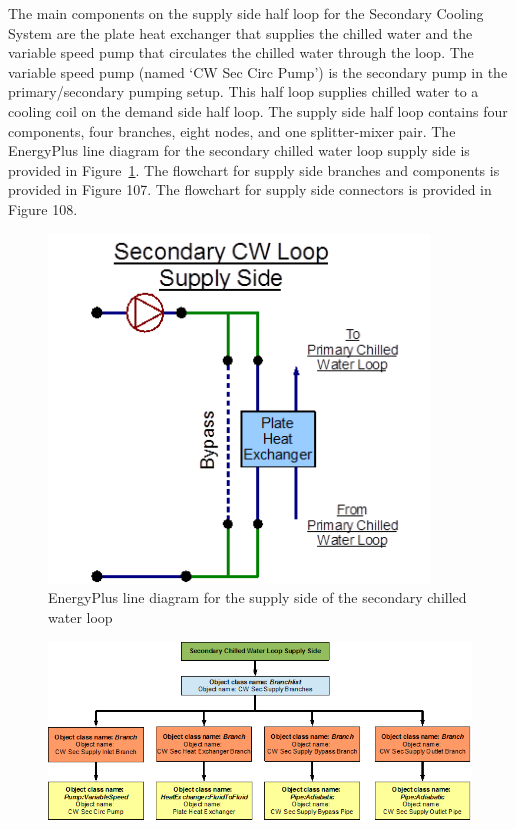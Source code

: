 The main components on the supply side half loop for the Secondary Cooling System are the plate heat exchanger that supplies the chilled water and the variable speed pump that circulates the chilled water through the loop. The variable speed pump (named `CW Sec Circ Pump') is the secondary pump in the primary/secondary pumping setup. This half loop supplies chilled water to a cooling coil on the demand side half loop. The supply side half loop contains four components, four branches, eight nodes, and one splitter-mixer pair. The EnergyPlus line diagram for the secondary chilled water loop supply side is provided in Figure~\ref{fig:energyplus-line-diagram-for-the-supply-side-007}. The flowchart for supply side branches and components is provided in Figure 107. The flowchart for supply side connectors is provided in Figure 108.

\begin{figure}[hbtp] %
\centering
\includegraphics[width=0.9\textwidth, height=0.9\textheight, keepaspectratio=true]{media/image106.png}
\caption{EnergyPlus line diagram for the supply side of the secondary chilled water loop \protect \label{fig:energyplus-line-diagram-for-the-supply-side-007}}
\end{figure}

\begin{figure}[htbp]
\centering
\includegraphics{media/image107.png}
\caption{}
\end{figure}

